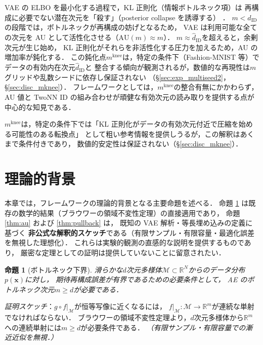 \documentclass[11pt,a4paper]{jsarticle}
\newtheorem{proposition}{命題}
\newcommand{\R}{\mathbb{R}}
\newcommand{\mknee}{m^{\mathrm{knee}}}
\begin{document}
VAE の ELBO を最小化する過程で，KL 正則化（情報ボトルネック項）は
再構成に必要でない潜在次元を「殺す」（posterior collapse を誘導する）
\cite{lucas2019elbo,higgins2017betavae}．
$m < \hat{d}_\mathrm{ID}$の段階では，ボトルネックが再構成の妨げとなるため，
VAE は利用可能な全ての次元を AU として活性化させる（$\mathrm{AU}(m) \approx m$）．
$m \approx \hat{d}_\mathrm{ID}$を超えると，余剰次元が生じ始め，
KL 正則化がそれらを非活性化する圧力を加えるため，AU の増加率が鈍化する．
この鈍化点$\mknee$は，特定の条件下（Fashion-MNIST 等）でデータの有効内在次元$\hat{d}_\mathrm{ID}$と
整合する傾向が観測されるが，数値的な再現性は$m$グリッドや乱数シードに依存し保証されない
（§\ref{sec:exp_multiseed2}，§\ref{sec:disc_mknee}）．
フレームワークとしては，$\mknee$の整合有無にかかわらず，
AU 値と TwoNN ID の組み合わせが頑健な有効次元の読み取りを提供する点が中心的な知見である．

$\mknee$は，特定の条件下では「KL 正則化がデータの有効次元付近で圧縮を始める可能性のある転換点」
として粗い参考情報を提供しうるが，この解釈はあくまで条件付きであり，
数値的安定性は保証されない（§\ref{sec:disc_mknee}）．

\section{理論的背景}\label{sec:theory}

本章では，フレームワークの理論的背景となる主要命題を述べる．
命題 \ref{thm:lower_bound} は既存の数学的結果（ブラウワーの領域不変性定理）の直接適用であり，
命題 \ref{thm:au} および \ref{thm:pullback} は，
既知の VAE 解析\cite{lucas2019elbo}・等長埋め込みの定義に基づく
\textbf{非公式な解釈的スケッチ}である（有限サンプル・有限容量・最適化誤差を無視した理想化）．
これらは実験的観測の直感的な説明を提供するものであり，
厳密な定理としての証明は提供していないことに留意されたい．

\begin{proposition}[ボトルネック下界]\label{thm:lower_bound}
滑らかな$d$次元多様体$\mathcal{M} \subset \R^N$からのデータ分布$p(\boldsymbol{x})$に対し，
期待再構成誤差が有界であるための必要条件として，
AE のボトルネック次元$m \geq d$が必要である．
\end{proposition}

\textit{証明スケッチ}：$g \circ f|_\mathcal{M}$が恒等写像に近くなるには，
$f|_\mathcal{M}: \mathcal{M} \to \R^m$が連続な単射でなければならない．
ブラウワーの領域不変性定理より，$d$次元多様体から$\R^m$への連続単射には$m \geq d$が必要条件である．
\textit{（有限サンプル・有限容量での漸近近似を無視．）}
\end{document}
